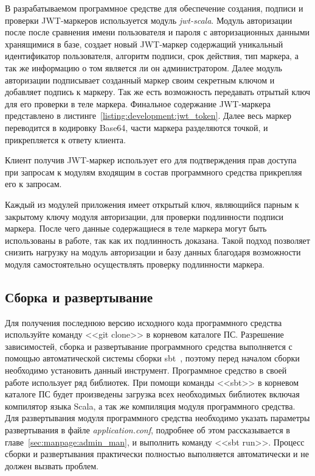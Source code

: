 В разрабатываемом программное средстве для обеспечение создания, подписи и проверки JWT-маркеров используется модуль \emph{jwt-scala}. Модуль авторизации после после сравнения имени пользователя и пароля с авторизационных данными хранящимися в базе, создает новый JWT-маркер содержащий уникальный идентификатор пользователя, алгоритм подписи, срок действия, тип маркера, а так же информацию о том является ли он администратором. Далее модуль авторизации подписывает созданный маркер своим секретным ключом и добавляет подпись к маркеру. Так же есть возможность передавать отрытый ключ для его проверки в теле маркера.
Финальное содержание JWT-маркера представлено в листинге~\ref{listing:development:jwt_token}. Далее весь маркер переводится в кодировку Base64, части маркера разделяются точкой, и прикрепляется к ответу клиента.


Клиент получив JWT-маркер использует его для подтверждения прав доступа при запросам к модулям входящим в состав программного средства прикрепляя его к запросам.

Каждый из модулей приложения имеет открытый ключ, являющийся парным к закрытому ключу модуля авторизации, для проверки подлинности подписи маркера. После чего данные содержащиеся в теле маркера могут быть использованы в работе, так как их подлинность доказана. Такой подход позволяет снизить нагрузку на модуль авторизации и базу данных благодаря возможности модуля самостоятельно осуществлять проверку подлинности маркера.

\subsection{Сборка и развертывание}
Для получения последнюю версию исходного кода программного средства используйте команду <<git clone>> в корневом каталоге ПС. Разрешение зависимостей, сборка и развертывание программного средства выполняется с помощью автоматической системы сборки sbt~\cite{sbt}, поэтому перед началом сборки необходимо установить данный инструмент. Программное средство в своей работе использует ряд библиотек. При помощи команды <<sbt>> в корневом каталоге ПС будет произведены загрузка всех необходимых библиотек включая компилятор языка Scala, а так же компиляция модуля программного средства.
Для развертывания модуля программного средства необходимо указать параметры развертывания в файле \emph{application.conf}, подробнее об этом рассказывается в главе~\ref{sec:manpage:admin_man}, и выполнить команду <<sbt run>>. Процесс сборки и развертывания практически полностью выполняется автоматически и не должен вызвать проблем.

